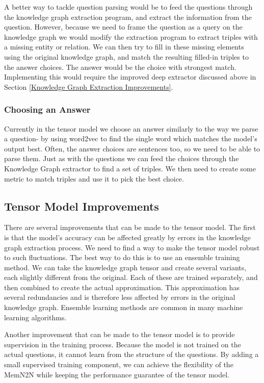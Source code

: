 \documentclass[pageno]{final_paper}
\begin{document}
A better way to tackle question parsing would be to feed the questions through
the knowledge graph extraction program, and extract the information from the
question. However, because we need to frame the question as a query on the
knowledge graph we would modify the extraction program to extract triples with a
missing entity or relation. We can then try to fill in these missing elements
using the original knowledge graph, and match the resulting filled-in triples to
the answer choices. The answer would be the choice with strongest match.
Implementing this would require the improved deep extractor discussed above in
Section \ref{Knowledge Graph Extraction Improvements}.

\subsubsection{Choosing an Answer}
\label{Choosing an Answer}

Currently in the tensor model we choose an answer similarly to the way we parse
a question- by using word2vec to find the single word which matches the model's
output best. Often, the answer choices are sentences too, so we need to be able
to parse them. Just as with the questions we can feed the choices through the
Knowledge Graph extractor to find a set of triples. We then need to create some
metric to match triples and use it to pick the best choice.

\subsection{Tensor Model Improvements}
\label{Tensor Model Improvements}

There are several improvements that can be made to the tensor model. The first
is that the model's accuracy can be affected greatly by errors in the knowledge
graph extraction process. We need to find a way to make the tensor model robust
to such fluctuations. The best way to do this is to use an ensemble training
method. We can take the knowledge graph tensor and create several variants, each
slightly different from the original. Each of these are trained separately, and
then combined to create the actual approximation. This approximation has several
redundancies and is therefore less affected by errors in the original knowledge
graph. Ensemble learning methods are common in many machine learning algorithms.

Another improvement that can be made to the tensor model is to provide
supervision in the training process. Because the model is not trained on the
actual questions, it cannot learn from the structure of the questions. By adding
a small supervised training component, we can achieve the flexibility of the
MemN2N while keeping the performance guarantee of the tensor model.
\end{document}
